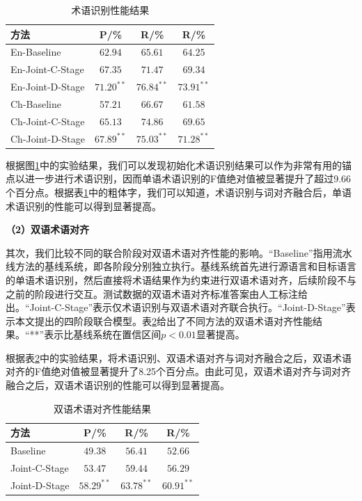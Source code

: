 \begin{table}[!htbp]
	\centering
	\begin{tabular}{|l|c|c|c|}
		\hline 
		方法  & P/\% & R/\% & R/\% \\ \hline
		En-Baseline      & $62.94$ & $65.61$ & $64.25$ \\ \hline
		En-Joint-C-Stage & $67.35$ & $71.47$ & $69.34$ \\ \hline
		En-Joint-D-Stage & $71.20^{**}$ & $76.84^{**}$ & $\mathbf{73.91^{**}}$ 
		\\ \hline
		Ch-Baseline      & $57.21$ & $66.67$ & $61.58$ \\ \hline
		Ch-Joint-C-Stage & $65.13$ & $74.86$ & $69.65$ \\ \hline
		Ch-Joint-D-Stage & $67.89^{**}$ & $75.03^{**}$ & $\mathbf{71.28^{**}}$ \\
		\hline
	\end{tabular}
	\caption{术语识别性能结果}
	\label{Table_term_recognition_result}
\end{table}

根据图\ref{Table_term_recognition_result}中的实验结果，我们可以发现初始化术语识别结果可以作为非常有用的锚点以进一步进行术语识别，因而单语术语识别的F值绝对值被显著提升了超过9.66个百分点。根据表\ref{Table_term_recognition_result}中的粗体字，我们可以知道，术语识别与词对齐融合后，单语术语识别的性能可以得到显著提高。

\textbf{（2）双语术语对齐}

其次，我们比较不同的联合阶段对双语术语对齐性能的影响。“Baseline”指用流水线方法的基线系统，即各阶段分别独立执行。基线系统首先进行源语言和目标语言的单语术语识别，然后直接将术语结果作为约束进行双语术语对齐，后续阶段不与之前的阶段进行交互。测试数据的双语术语对齐标准答案由人工标注给出。“Joint-C-Stage”表示仅术语识别与双语术语对齐联合执行。“Joint-D-Stage”表示本文提出的四阶段联合模型。表\ref{Table_term_alignment_result}给出了不同方法的双语术语对齐性能结果。“**”表示比基线系统在置信区间$p<0.01$显著提高。

根据表\ref{Table_term_alignment_result}中的实验结果，将术语识别、双语术语对齐与词对齐融合之后，双语术语对齐的F值绝对值被显著提升了8.25个百分点。由此可见，双语术语对齐与词对齐融合之后，双语术语识别的性能可以得到显著提高。

\begin{table}[!htbp]
	\centering
	\begin{tabular}{|l|c|c|c|}
		\hline
		方法  &  P/\% &  R/\% &  R/\% \\
		\hline
		Baseline      & $49.38$ & $56.41$ & $52.66$ \\ \hline
		Joint-C-Stage & $53.47$ & $59.44$ & $56.29$ \\ \hline
		Joint-D-Stage & $58.29^{**}$ & $63.78^{**}$ & $\mathbf{60.91^{**}}$ \\
		\hline
	\end{tabular}
	\caption{双语术语对齐性能结果}
	\label{Table_term_alignment_result}
\end{table}

